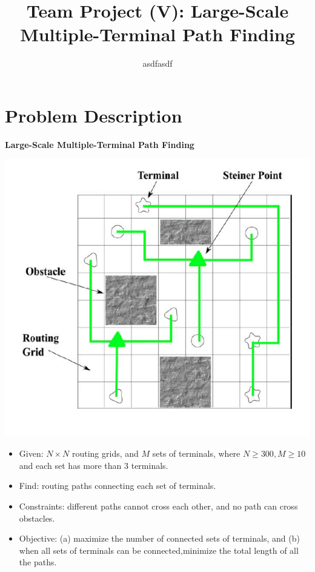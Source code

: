 \documentclass[12pt, a4paper]{article}
\title{Team Project (V): Large-Scale Multiple-Terminal Path Finding}
\author{asdfasdf}
\begin{document}
	\sloppypar

	\maketitle
	
	\tableofcontents
	\newpage
	
	\section{Problem Description}
	
		\begin{center}
			\textbf{Large-Scale Multiple-Terminal Path Finding}
		\end{center}
		
		\includegraphics{problem.png}
		
		\begin{itemize}
		
		\item Given: $N \times N$ routing grids, and $M$ sets of terminals, where $N \geq 300, M \geq 10$ and each set has more than 3 terminals.
		\item Find: routing paths connecting each set of terminals.
		\item Constraints: different paths cannot cross each other, and no path can cross obstacles.
		\item Objective: (a) maximize the number of connected sets of terminals, and (b) when all sets of terminals can be connected,minimize the total length of all the paths.
		
		\end{itemize}
	
\end{document}
